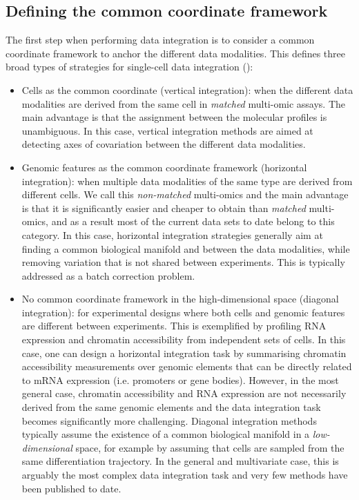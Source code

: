 \subsection{Defining the common coordinate framework}

The first step when performing data integration is to consider a common coordinate framework to anchor the different data modalities. This defines three broad types of strategies for single-cell data integration (): 

\begin{itemize}

	\item Cells as the common coordinate (vertical integration): when the different data modalities are derived from the same cell in \textit{matched} multi-omic assays. The main advantage is that the assignment between the molecular profiles is unambiguous. In this case, vertical integration methods are aimed at detecting axes of covariation between the different data modalities. 

	\item Genomic features as the common coordinate framework (horizontal integration): when multiple data modalities of the same type are derived from different cells. We call this \textit{non-matched} multi-omics and the main advantage is that it is significantly easier and cheaper to obtain than \textit{matched} multi-omics, and as a result most of the current data sets to date belong to this category. In this case, horizontal integration strategies generally aim at finding a common biological manifold and between the data modalities, while removing variation that is not shared between experiments. This is typically addressed as a batch correction problem.

	\item No common coordinate framework in the high-dimensional space (diagonal integration): for experimental designs where both cells and genomic features are different between experiments. This is exemplified by profiling RNA expression and chromatin accessibility from independent sets of cells. In this case, one can design a horizontal integration task by summarising chromatin accessibility measurements over genomic elements that can be directly related to mRNA expression (i.e. promoters or gene bodies). However, in the most general case, chromatin accessibility and RNA expression are not necessarily derived from the same genomic elements and the data integration task becomes significantly more challenging. Diagonal integration methods typically assume the existence of a common biological manifold in a \textit{low-dimensional} space, for example by assuming that cells are sampled from the same differentiation trajectory. In the general and multivariate case, this is arguably the most complex data integration task and very few methods have been published to date.

\end{itemize}

